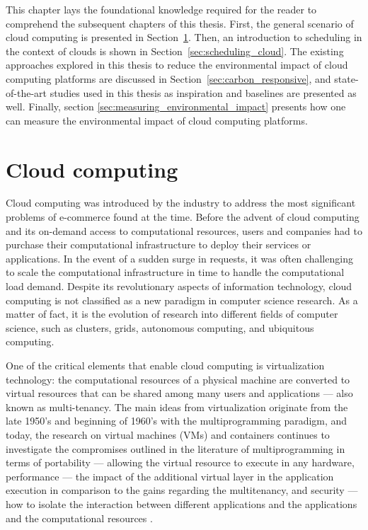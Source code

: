 This chapter lays the foundational knowledge required for the reader to comprehend the subsequent chapters of this thesis. First, the general scenario of cloud computing is presented in Section~\ref{sec:cloud}. Then, an introduction to scheduling in the context of clouds is shown in Section~\ref{sec:scheduling_cloud}. The existing approaches explored in this thesis to reduce the environmental impact of cloud computing platforms are discussed in Section~\ref{sec:carbon_responsive}, and state-of-the-art studies used in this thesis as inspiration and baselines are presented as well. Finally, section \ref{sec:measuring_environmental_impact} presents how one can measure the environmental impact of cloud computing platforms.

\section{Cloud computing}

\label{sec:cloud}

Cloud computing was introduced by the industry to address the most significant problems of e-commerce found at the time. Before the advent of cloud computing and its on-demand access to computational resources, users and companies had to purchase their computational infrastructure to deploy their services or applications. In the event of a sudden surge in requests, it was often challenging to scale the computational infrastructure in time to handle the computational load demand. Despite its revolutionary aspects of information technology, cloud computing is not classified as a new paradigm in computer science research. As a matter of fact, it is the evolution of research into different fields of computer science, such as clusters, grids, autonomous computing, and ubiquitous computing. 

One of the critical elements that enable cloud computing is virtualization technology: the computational resources of a physical machine are converted to virtual resources that can be shared among many users and applications --- also known as multi-tenancy.  The main ideas from virtualization originate from the late 1950's and beginning of 1960's with the multiprogramming paradigm, and today, the research on virtual machines (VMs) and containers continues to investigate the compromises outlined in the literature of multiprogramming in terms of portability --- allowing the virtual resource to execute in any hardware,  performance --- the impact of the additional virtual layer in the application execution in comparison to the gains regarding the multitenancy, and security --- how to isolate the interaction between different applications and the applications and the computational resources \cite{randall2020_virtualization}.

